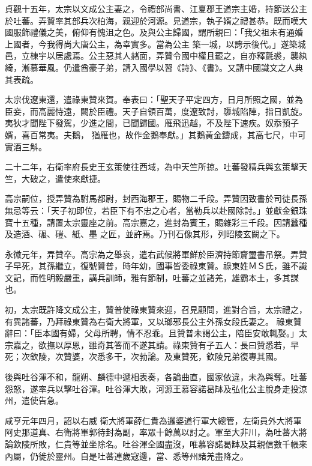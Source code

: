 \begin{pinyinscope}
 貞觀十五年，太宗以文成公主妻之，令禮部尚書、江夏郡王道宗主婚，持節送公主於吐蕃。弄贊率其部兵次柏海，親迎於河源。見道宗，執子婿之禮甚恭。既而嘆大國服飾禮儀之美，俯仰有愧沮之色。及與公主歸國，謂所親曰：「我父祖未有通婚上國者，今我得尚大唐公主，為幸實多。當為公主
 築一城，以誇示後代。」遂築城邑，立棟宇以居處焉。公主惡其人赭面，弄贊令國中權且罷之，自亦釋氈裘，襲紈綺，漸慕華風。仍遣酋豪子弟，請入國學以習《詩》、《書》。又請中國識文之人典其表疏。



 太宗伐遼東還，遣祿東贊來賀。奉表曰：「聖天子平定四方，日月所照之國，並為臣妾，而高麗恃遠，闕於臣禮。天子自領百萬，度遼致討，隳城陷陣，指日凱旋。夷狄才聞陛下發駕，少進之間，已聞歸國。雁飛迅越，不及陛下速疾。奴忝預子婿，喜百常夷。夫鵝，
 猶雁也，故作金鵝奉獻。」其鵝黃金鑄成，其高七尺，中可實酒三斛。



 二十二年，右衛率府長史王玄策使往西域，為中天竺所掠。吐蕃發精兵與玄策擊天竺，大破之，遣使來獻捷。



 高宗嗣位，授弄贊為駙馬都尉，封西海郡王，賜物二千段。弄贊因致書於司徒長孫無忌等云：「天子初即位，若臣下有不忠之心者，當勒兵以赴國除討。」並獻金銀珠寶十五種，請置太宗靈座之前。高宗嘉之，進封為賓王，賜雜彩三千段。因請蠶種及造酒、碾、磑、紙、墨
 之匠，並許焉。乃刊石像其形，列昭陵玄闕之下。



 永徽元年，弄贊卒。高宗為之舉哀，遣右武候將軍鮮於臣濟持節齎璽書吊祭。弄贊子早死，其孫繼立，復號贊普，時年幼，國事皆委祿東贊。祿東姓ＭＳ氏，雖不識文記，而性明毅嚴重，講兵訓師，雅有節制，吐蕃之並諸羌，雄霸本土，多其謀也。



 初，太宗既許降文成公主，贊普使祿東贊來迎，召見顧問，進對合旨，太宗禮之，有異諸蕃，乃拜祿東贊為右衛大將軍，又以瑯邪長公主外孫女段氏妻之。
 祿東贊辭曰：「臣本國有婦，父母所聘，情不忍乖。且贊普未謁公主，陪臣安敢輒娶。」太宗嘉之，欲撫以厚恩，雖奇其答而不遂其請。祿東贊有子五人：長曰贊悉若，早死；次欽陵，次贊婆，次悉多干，次勃論。及東贊死，欽陵兄弟復專其國。



 後與吐谷渾不和，龍朔、麟德中遞相表奏，各論曲直，國家依違，未為與奪。吐蕃怨怒，遂率兵以擊吐谷渾。吐谷渾大敗，河源王慕容諾曷缽及弘化公主脫身走投涼州，遣使告急。



 咸亨元年四月，詔以右威
 衛大將軍薛仁貴為邏婆道行軍大總管，左衛員外大將軍阿史那道真、右衛將軍郭待封為副，率眾十餘萬以討之。軍至大非川，為吐蕃大將論欽陵所敗，仁貴等並坐除名。吐谷渾全國盡沒，唯慕容諾曷缽及其親信數千帳來內屬，仍徙於靈州。自是吐蕃連歲寇邊，當、悉等州諸羌盡降之。




\end{pinyinscope}
